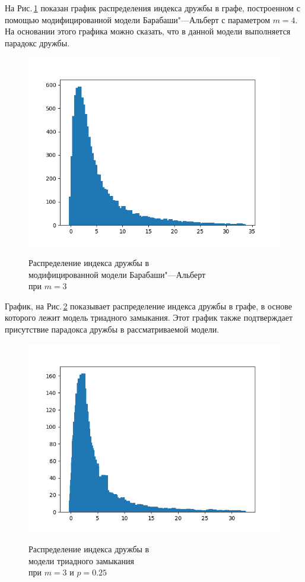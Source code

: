 \documentclass[bachelor, och, diploma]{SCWorks}
\begin{document}
На Рис.\,\ref{fig:baps3} показан график распределения индекса дружбы в графе, построенном с помощью модифицированной модели Барабаши"---Альберт с параметром $ m=4 $. На основании этого графика можно сказать, что в данной модели выполняется парадокс дружбы.
\begin{figure}[!ht]
\centering
\includegraphics[scale=0.7]{diploma_results/static/bap_dist_beta_3.png}\\
\caption{Распределение индекса дружбы  в\\ модифицированной модели Барабаши"---Альберт\\ при $m=3$}\label{fig:baps3}
\end{figure}

График, на Рис.\,\ref{fig:triads3} показывает распределение индекса дружбы в графе, в основе которого лежит модель триадного замыкания. Этот график также подтверждает присутствие парадокса дружбы в рассматриваемой модели.
\begin{figure}[!ht]
\centering
\includegraphics[scale=0.7]{diploma_results/static/triad_dist_beta_3_0.25.png}\\
\caption{Распределение индекса дружбы  в\\ модели триадного замыкания\\ при $m=3$ и $ p=0.25 $}\label{fig:triads3}
\end{figure}
\end{document}
